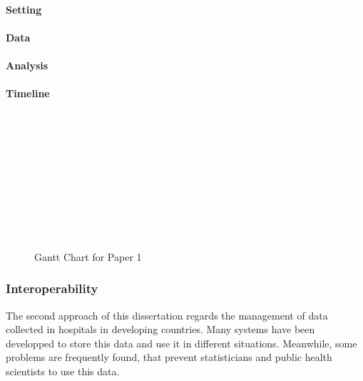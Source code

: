 \documentclass[a4paper,11pt,final,twoside]{article}
\begin{document}
\paragraph{Setting}

\paragraph{Data}

\paragraph{Analysis}

\paragraph{Timeline}

\begin{figure}[h]
\begin{ganttchart}{1}{24}
 \\
 \\
 \\
 \\
 \\
 \\
 \\
 \\
 \\
\end{ganttchart}
\caption{Gantt Chart for Paper 1}
\end{figure}


\subsubsection{Interoperability }

The second approach of this dissertation regards the management of data collected in hospitals in developing countries. Many systems have been developped to store this data and use it in different situations. Meanwhile, some problems are frequently found, that prevent statisticians and public health scientists to use this data.
\end{document}
